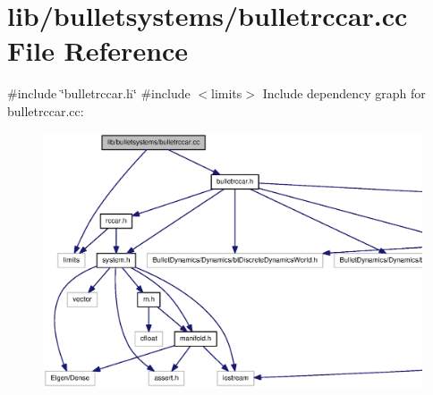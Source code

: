 \section{lib/bulletsystems/bulletrccar.cc \-File \-Reference}
\label{bulletrccar_8cc}
{\ttfamily \#include \char`\"{}bulletrccar.\-h\char`\"{}}\*
{\ttfamily \#include $<$limits$>$}\*
\-Include dependency graph for bulletrccar.\-cc\-:\nopagebreak
\begin{figure}[H]
\begin{center}
\leavevmode
\includegraphics[width=350pt]{bulletrccar_8cc__incl}
\end{center}
\end{figure}
